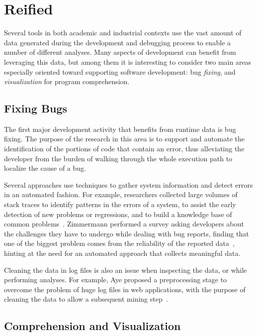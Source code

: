 \section{Reified} \label{sec:related-reified}

Several tools in both academic and industrial contexts use the vast amount of data generated during the development and debugging process to enable a number of different analyses.
Many aspects of development can benefit from leveraging this data, but among them it is interesting to consider two main areas especially oriented toward supporting software development: bug \emph{fixing}, and \emph{visualization} for program comprehension.

\subsection{Fixing Bugs}

The first major development activity that benefits from runtime data is bug fixing.
The purpose of the research in this area is to support and automate the identification of the portions of code that contain an error, thus alleviating the developer from the burden of walking through the whole execution path to localize the cause of a bug.

Several approaches use techniques to gather system information and detect errors in an automated fashion.
For example, researchers collected large volumes of stack traces to identify patterns in the errors of a system, to assist the early detection of new problems or regressions, and to build a knowledge base of common problems~\cite{Han2012,Arno2007,DalS2015b}.
Zimmermann \etal performed a survey asking developers about the challenges they have to undergo while dealing with bug reports, finding that one of the biggest problem comes from the reliability of the reported data~\cite{Zimm2010a}, hinting at the need for an automated approach that collects meaningful data.

Cleaning the data in log files is also an issue when inspecting the data, or while performing analyses.
For example, Aye proposed a preprocessing stage to overcome the problem of huge log files in web applications, with the purpose of cleaning the data to allow a subsequent mining step~\cite{Aye2011}.

\subsection{Comprehension and Visualization}

